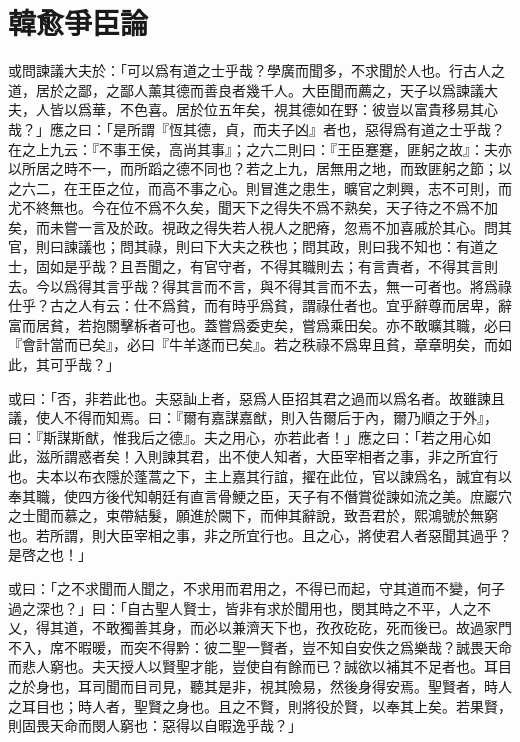 \section[爭臣論\quad{\small 韓愈}]{{\normalsize 韓愈}\quad 爭臣論}
或問諫議大夫於：「可以爲有道之士乎哉？學廣而聞多，不求聞於人也。行古人之道，居於之鄙，之鄙人薰其德而善良者幾千人。大臣聞而薦之，天子以爲諫議大夫，人皆以爲華，不色喜。居於位五年矣，視其德如在野：彼豈以富貴移易其心哉？」應之曰：「是所謂『恆其德，貞，而夫子凶』者也，惡得爲有道之士乎哉？在之上九云：『不事王侯，高尚其事』；之六二則曰：『王臣蹇蹇，匪躬之故』：夫亦以所居之時不一，而所蹈之德不同也？若之上九，居無用之地，而致匪躬之節；以之六二，在王臣之位，而高不事之心。則冒進之患生，曠官之刺興，志不可則，而尤不終無也。今在位不爲不久矣，聞天下之得失不爲不熟矣，天子待之不爲不加矣，而未嘗一言及於政。視政之得失若人視人之肥瘠，忽焉不加喜戚於其心。問其官，則曰諫議也；問其祿，則曰下大夫之秩也；問其政，則曰我不知也：有道之士，固如是乎哉？且吾聞之，有官守者，不得其職則去；有言責者，不得其言則去。今以爲得其言乎哉？得其言而不言，與不得其言而不去，無一可者也。將爲祿仕乎？古之人有云：仕不爲貧，而有時乎爲貧，謂祿仕者也。宜乎辭尊而居卑，辭富而居貧，若抱關擊柝者可也。蓋嘗爲委吏矣，嘗爲乘田矣。亦不敢曠其職，必曰『會計當而已矣』，必曰『牛羊遂而已矣』。若之秩祿不爲卑且貧，章章明矣，而如此，其可乎哉？」

或曰：「否，非若此也。夫惡訕上者，惡爲人臣招其君之過而以爲名者。故雖諫且議，使人不得而知焉。曰：『爾有嘉謀嘉猷，則入告爾后于內，爾乃順之于外』，曰：『斯謀斯猷，惟我后之德』。夫之用心，亦若此者！」應之曰：「若之用心如此，滋所謂惑者矣！入則諫其君，出不使人知者，大臣宰相者之事，非之所宜行也。夫本以布衣隱於蓬蒿之下，主上嘉其行誼，擢在此位，官以諫爲名，誠宜有以奉其職，使四方後代知朝廷有直言骨鯁之臣，天子有不僭賞從諫如流之美。庶巖穴之士聞而慕之，束帶結髮，願進於闕下，而伸其辭說，致吾君於，熙鴻號於無窮也。若所謂，則大臣宰相之事，非之所宜行也。且之心，將使君人者惡聞其過乎？是啓之也！」

或曰：「之不求聞而人聞之，不求用而君用之，不得已而起，守其道而不變，何子過之深也？」曰：「自古聖人賢士，皆非有求於聞用也，閔其時之不平，人之不乂，得其道，不敢獨善其身，而必以兼濟天下也，孜孜矻矻，死而後已。故過家門不入，席不暇暖，而突不得黔：彼二聖一賢者，豈不知自安佚之爲樂哉？誠畏天命而悲人窮也。夫天授人以賢聖才能，豈使自有餘而已？誠欲以補其不足者也。耳目之於身也，耳司聞而目司見，聽其是非，視其險易，然後身得安焉。聖賢者，時人之耳目也；時人者，聖賢之身也。且之不賢，則將役於賢，以奉其上矣。若果賢，則固畏天命而閔人窮也：惡得以自暇逸乎哉？」

